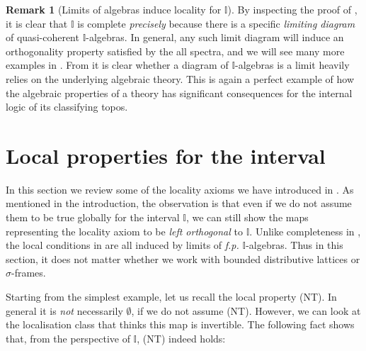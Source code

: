 \documentclass[12pt]{amsart}
\theoremstyle{definition}
\newtheorem{remark}[theorem]{Remark}
\newcommand{\mbb}[1]{\mathbb{#1}}
\newcommand{\I}{\mbb I}
\newcommand{\emp}{\emptyset}
\newcommand{\spec}{\operatorname{Spec}}
\begin{document}
\begin{remark}[Limits of algebras induce locality for $\I$]\label{rem:limofalgloc}
  By inspecting the proof of , it is clear that $\I$ is complete \emph{precisely} because there is a specific \emph{limiting diagram} of quasi-coherent $\I$-algebras. In general, any such limit diagram will induce an orthogonality property satisfied by the all spectra, and we will see many more examples in . From  it is clear whether a diagram of $\I$-algebras is a limit heavily relies on the underlying algebraic theory. This is again a perfect example of how the algebraic properties of a theory has significant consequences for the internal logic of its classifying topos.
\end{remark}

\section{Local properties for the interval}\label{sec:local}

In this section we review some of the locality axioms we have introduced in . As mentioned in the introduction, the observation is that even if we do not assume them to be true globally for the interval $\I$, we can still show the maps representing the locality axiom to be \emph{left orthogonal} to $\I$.  
Unlike completeness in , the local conditions in  are all induced by limits of \emph{f.p.} $\I$-algebras. Thus in this section, it does not matter whether we work with bounded distributive lattices or $\sigma$-frames.

Starting from the simplest example, let us recall the local property (NT). In general it is \emph{not} necessarily $\emp$, if we do not assume (NT). However, we can look at the localisation class that thinks this map is invertible. The following fact shows that, from the perspective of $\I$, (NT) indeed holds:
\end{document}
